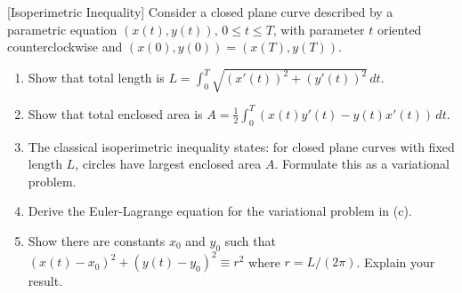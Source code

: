 \begin{exercise}
\label{applied:2015:9}
[Isoperimetric Inequality]
Consider a closed plane curve described by a parametric equation $(x(t),y(t))$, $0\leq t\leq T$, with parameter $t$ oriented counterclockwise and $(x(0),y(0))=(x(T),y(T))$.

\begin{enumerate}
\item[(a)] Show that total length is $L=\int_{0}^{T}\sqrt{(x'(t))^{2}+(y'(t))^{2}}\,dt$.
\item[(b)] Show that total enclosed area is $A=\frac{1}{2}\int_{0}^{T}(x(t)y'(t)-y(t)x'(t))\,dt$.
\item[(c)] The classical isoperimetric inequality states: for closed plane curves with fixed length $L$, circles have largest enclosed area $A$. Formulate this as a variational problem.
\item[(d)] Derive the Euler-Lagrange equation for the variational problem in (c).
\item[(e)] Show there are constants $x_{0}$ and $y_{0}$ such that $(x(t)-x_{0})^{2}+(y(t)-y_{0})^{2}\equiv r^{2}$ where $r=L/(2\pi)$. Explain your result.
\end{enumerate}
\end{exercise}

